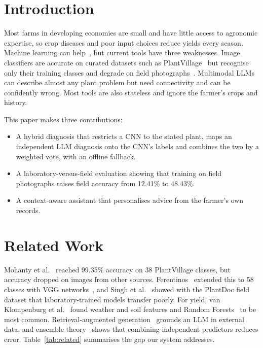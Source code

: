 \documentclass[conference]{IEEEtran}
\begin{document}
\section{Introduction}
Most farms in developing economies are small and have little access to agronomic expertise, so crop diseases and poor input choices reduce yields every season. Machine learning can help~\cite{kamilaris2018,liakos2018}, but current tools have three weaknesses. Image classifiers are accurate on curated datasets such as PlantVillage~\cite{hughes2015} but recognise only their training classes and degrade on field photographs~\cite{mohanty2016,singh2020plantdoc}. Multimodal LLMs~\cite{gemini2023} can describe almost any plant problem but need connectivity and can be confidently wrong. Most tools are also stateless and ignore the farmer's crops and history.

This paper makes three contributions:
\begin{itemize}
\item A hybrid diagnosis that restricts a CNN to the stated plant, maps an independent LLM diagnosis onto the CNN's labels and combines the two by a weighted vote, with an offline fallback.
\item A laboratory-versus-field evaluation showing that training on field photographs raises field accuracy from 12.41\% to 48.43\%.
\item A context-aware assistant that personalises advice from the farmer's own records.
\end{itemize}

\section{Related Work}
Mohanty et al.~\cite{mohanty2016} reached 99.35\% accuracy on 38 PlantVillage classes, but accuracy dropped on images from other sources. Ferentinos~\cite{ferentinos2018} extended this to 58 classes with VGG networks~\cite{simonyan2015}, and Singh et al.~\cite{singh2020plantdoc} showed with the PlantDoc field dataset that laboratory-trained models transfer poorly. For yield, van Klompenburg et al.~\cite{vanklompenburg2020} found weather and soil features and Random Forests~\cite{breiman2001} to be most common. Retrieval-augmented generation~\cite{lewis2020} grounds an LLM in external data, and ensemble theory~\cite{dietterich2000} shows that combining independent predictors reduces error. Table~\ref{tab:related} summarises the gap our system addresses.
\end{document}
